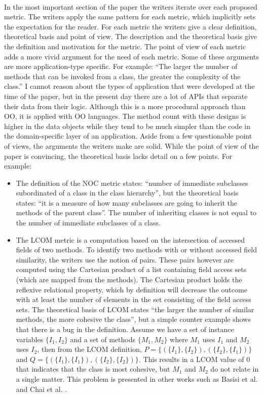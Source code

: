 \paragraph{}
In the most important section of the paper the writers iterate over each proposed metric. The writers apply the
same pattern for each metric, which implicitly sets the expectation for the reader. For each metric the writers give a
clear definition, theoretical basis and point of view. The description and the theoretical basis give the definition and
motivation for the metric. The point of view of each metric adds a more vivid argument for the need of each metric.
Some of these arguments are more application-type specific. For example: ``The larger the number of methods that can be
invoked from a class, the greater the complexity of the class.'' I cannot reason about the types of application that were
developed at the time of the paper, but in the present day there are a lot of APIs that separate their data from their
logic. Although this is a more procedural approach than OO, it is applied with OO languages. The method count
with these designs is higher in the data objects while they tend to be much simpler than the code in the domain-specific
layer of an application. Aside from a few questionable point of views, the arguments the writers make are solid.
While the point of view of the paper is convincing, the theoretical basis lacks detail on a few points. For example:

\begin{itemize}
\item
The definition of the NOC metric states: ``number of immediate subclasses subordinated of a class in the class
hierarchy'', but the theoretical basis states: ``it is a measure of how many subclasses are going to inherit
the methods of the parent class''. The number of inheriting classes is not equal to the number of immediate subclasses of a
class.
\item
The LCOM metric is a computation based on the intersection of accessed fields of two methods. To identify two
methods with or without accessed field similarity, the writers use the notion of pairs. These pairs however are
computed using the Cartesian product of a list containing field access sets (which are mapped from the
methods). The Cartesian product holds the reflexive relational property, which by definition will decrease
the outcome with at least the number of elements in the set consisting of the field access sets.
The theoretical basis of LCOM states ``the larger the number of similar methods, the more cohesive the class'',
but a simple counter example shows that there is a bug in the definition. Assume we have a set of instance
variables $\{I_1, I_2\}$ and a set of methods $\{M_1, M_2\}$ where $M_1$ uses $I_1$ and $M_2$ uses $I_2$, then from
the LCOM definition, $P = \{( \{I_1\}, \{I_2\} ), ( \{I_2\}, \{I_1\} ) \}$ and
$Q = \{( \{I_1\}, \{I_1\} ), ( \{I_2\}, \{I_2\} ) \}$. This results in a LCOM value of $0$ that indicates that
the class is most cohesive, but $M_1$ and $M_2$ do not relate in a single matter. This problem is presented in other
works such as Basisi et al. \autocite{BASILI} and Chai et al. \autocite{CHAE}.
\end{itemize}

